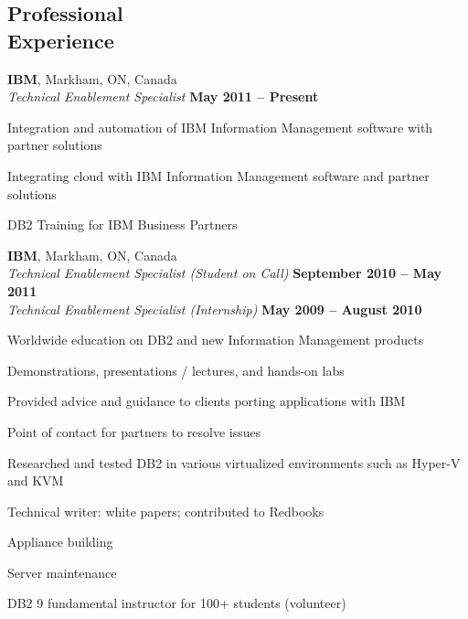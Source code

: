 \documentclass[margin,line]{resume}
\begin{document}
\begin{resume}
\section{\mysidestyle Professional\\Experience}

	\textbf{IBM}, Markham, ON, Canada				\vspace{2mm}\\\vspace{1mm}
	\textsl{Technical Enablement Specialist}			\hfill\textbf{May 2011 -- Present}		\\\vspace{-3mm}
	\begin{list2}
		\item Integration and automation of IBM Information Management software with partner solutions
		\item Integrating cloud with IBM Information Management software and partner solutions
		\item DB2 Training for IBM Business Partners
	\end{list2}
	\textbf{IBM}, Markham, ON, Canada				\vspace{2mm}\\\vspace{1mm}
	\textsl{Technical Enablement Specialist (Student on Call)}	\hfill\textbf{September 2010 -- May 2011}	\\
	\textsl{Technical Enablement Specialist (Internship)}		\hfill\textbf{May 2009 -- August 2010}		\\\vspace{-1.5mm}
	\begin{list2}
		\item Worldwide education on DB2 and new Information Management products
		\item Demonstrations, presentations / lectures, and hands-on labs
		\item Provided advice and guidance to clients porting applications with IBM
		\item Point of contact for partners to resolve issues
		\item Researched and tested DB2 in various virtualized environments such as Hyper-V and KVM
		\item Technical writer: white papers; contributed to Redbooks
		\item Appliance building
		\item Server maintenance
		\item DB2 9 fundamental instructor for 100+ students (volunteer)
	\end{list2}


\end{resume}
\end{document}
